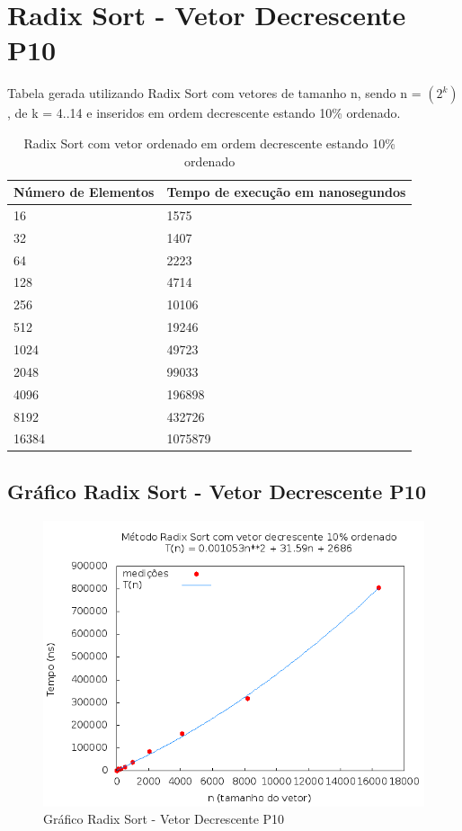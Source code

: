 \documentclass[12pt,a4paper,twoside]{report}
\begin{document}
\section{Radix Sort - Vetor Decrescente P10}
Tabela gerada utilizando Radix Sort com vetores de tamanho n, sendo n = $(2^k)$, de k = 4..14 e inseridos em ordem decrescente estando 10\% ordenado.
\begin{table}[H]
\centering
\caption{Radix Sort com vetor ordenado em ordem decrescente estando 10\% ordenado}
\label{my-label}
\begin{tabular}{|l|l|}
\hline
\multicolumn{1}{|c|}{\textbf{Número de Elementos}} & \multicolumn{1}{c|}{\textbf{Tempo de execução em nanosegundos}} \\ \hline
16 & 1575 \\ \hline
32 & 1407 \\ \hline
64 & 2223 \\ \hline
128 & 4714 \\ \hline
256 & 10106 \\ \hline
512 & 19246 \\ \hline
1024 & 49723 \\ \hline
2048 & 99033 \\ \hline
4096 & 196898 \\ \hline
8192 & 432726 \\ \hline
16384 & 1075879 \\ \hline
\end{tabular}
\end{table}

\subsection{Gráfico Radix Sort - Vetor Decrescente P10}
\begin{figure}[H]
    \centering
    \includegraphics[width=0.7\linewidth]{graficos/RadixSort/vIntDecrescenteP10/vIntDecrescenteP10.png}
  \caption{Gráfico Radix Sort - Vetor Decrescente P10}
\end{figure}
\end{document}
